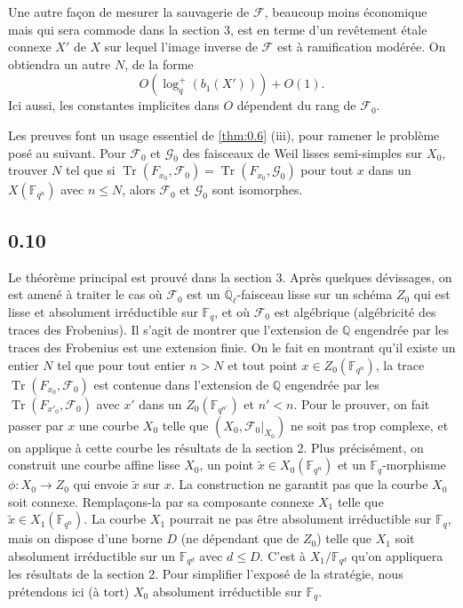 \documentclass[11pt,a4paper]{article}
\theoremstyle{plain}
\theoremstyle{definition}
\DeclareMathOperator{\tr}{Tr}
\begin{document}
Une autre fa\c{c}on de mesurer la sauvagerie de $\mathcal{F}$, beaucoup moins \'economique mais qui sera commode dans la section 3, est en terme d'un rev\^etement \'etale connexe $X'$ de $X$ sur lequel l'image inverse de $\mathcal{F}$ est \`a ramification mod\'er\'ee. On obtiendra un autre $N$, de la forme
\begin{equation}\label{eq:0.9.2}
O(\log_q^+(b_1(X'))) + O(1).
\end{equation}
Ici aussi, les constantes implicites dans $O$ d\'ependent du rang de $\mathcal{F}_0$.

Les preuves font un usage essentiel de \ref{thm:0.6} (iii), pour ramener le probl\`eme pos\'e au suivant. Pour $\mathcal{F}_0$ et $\mathcal{G}_0$ des faisceaux de Weil lisses semi-simples sur $X_0$, trouver $N$ tel que si $\tr(F_{x_0},\mathcal{F}_0) = \tr(F_{x_0},\mathcal{G}_0)$ pour tout $x$ dans un $X(\mathbb{F}_{q^n})$ avec $n \leq N$, alors $\mathcal{F}_0$ et $\mathcal{G}_0$ sont isomorphes.

\subsection*{0.10}

Le th\'eor\`eme principal est prouv\'e dans la section 3. Apr\`es quelques d\'evissages, on est amen\'e \`a traiter le cas o\`u $\mathcal{F}_0$ est un $\overline{\mathbb{Q}}_\ell$-faisceau lisse sur un sch\'ema $Z_0$ qui est lisse et absolument irr\'eductible sur $\mathbb{F}_q$, et o\`u $\mathcal{F}_0$ est alg\'ebrique (alg\'ebricit\'e des traces des Frobenius). Il s'agit de montrer que l'extension de $\mathbb{Q}$ engendr\'ee par les traces des Frobenius est une extension finie. On le fait en montrant qu'il existe un entier $N$ tel que pour tout entier $n > N$ et tout point $x \in Z_0(\mathbb{F}_{q^n})$, la trace $\tr(F_{x_0}, \mathcal{F}_0)$ est contenue dans l'extension de $\mathbb{Q}$ engendr\'ee par les $\tr(F_{x'_0}, \mathcal{F}_0)$ avec $x'$ dans un $Z_0(\mathbb{F}_{q^{n'}})$ et $n' < n$. Pour le prouver, on fait passer par $x$ une courbe $X_0$ telle que $(X_0, \mathcal{F}_0|_{X_0})$ ne soit pas trop complexe, et on applique \`a cette courbe les r\'esultats de la section 2. Plus pr\'ecis\'ement, on construit une courbe affine lisse $X_0$, un point $\tilde{x} \in X_0(\mathbb{F}_{q^n})$ et un $\mathbb{F}_q$-morphisme $\phi: X_0 \to Z_0$ qui envoie $\tilde{x}$ sur $x$. La construction ne garantit pas que la courbe $X_0$ soit connexe. Rempla\c{c}ons-la par sa composante connexe $X_1$ telle que $\tilde{x} \in X_1(\mathbb{F}_{q^n})$. La courbe $X_1$ pourrait ne pas \^etre absolument irr\'eductible sur $\mathbb{F}_q$, mais on dispose d'une borne $D$ (ne d\'ependant que de $Z_0$) telle que $X_1$ soit absolument irr\'eductible sur un $\mathbb{F}_{q^d}$ avec $d \leq D$. C'est \`a $X_1/\mathbb{F}_{q^d}$ qu'on appliquera les r\'esultats de la section 2. Pour simplifier l'expos\'e de la strat\'egie, nous pr\'etendons ici (\`a tort) $X_0$ absolument irr\'eductible sur $\mathbb{F}_q$.
\end{document}
